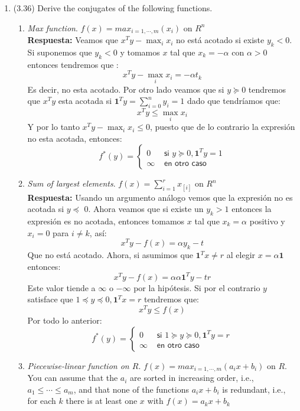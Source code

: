 \documentclass[12pt, oneside]{article}%
\begin{document}
\begin{enumerate}
\begin{enumerate}
\end{enumerate}
\item (3.36) Derive the conjugates of the following functions.
\begin{enumerate}
    \item \textit{Max function}. $f(x) = max_{i=1,\cdots,m}(x_i)$ on $R^n$ \\ 
    \textbf{Respuesta:}
    Veamos que $x^Ty-\max_i x_i$ no está acotado si existe $y_k<0$. Si suponemos que $y_k<0$ y tomamos $x$ tal que $x_k=-\alpha$ con $\alpha>0$ entonces tendremos que :
    $$x^Ty-\max_ix_i=-\alpha t_k$$
    Es decir, no esta acotado.
    Por otro lado veamos que si $y\succeq 0$ tendremos que $x^Ty$ esta acotada si $\textbf{1}^Ty=\sum_{i=0}^n y_i=1$ dado que tendríamos que:
    $$x^Ty\leq \max_i x_i$$
    Y por lo tanto $x^Ty-\max_i x_i\leq0 $, puesto que de lo contrario la expresión no esta acotada, entonces:
    $$f^*(y)=\begin{cases}
    0 & \textsf{ si } y\succeq 0, \textbf{1}^Ty=1\\
    \infty& \textsf{ en otro caso}
    \end{cases}$$
    \item \textit{Sum of largest elements}. $f(x) = \sum_{i=1}^r x_{[i]}$ on $R^n$ \\
    \textbf{Respuesta:}
    Usando un argumento análogo vemos que la expresión no es acotada si $y \preceq$ 0. Ahora veamos que si existe un $y_k>1$ entonces la expresión es no acotada, entonces tomamos $x$ tal que $x_k=\alpha$ positivo y $x_i=0$ para $i\neq k$, así:
    $$x^Ty- f(x)= \alpha y_k-t$$
    Que no está acotado.
    Ahora, si asumimos que $\textbf{1}^Tx\neq r$ al elegir $x= \alpha\textbf{1}$ entonces:
    $$x^Ty- f(x)= \alpha \alpha \textbf{1}^Ty-tr$$
    Este valor tiende a $\infty$ o $-\infty$ por la hipótesis.
    Si por el contrario $y$ satisface que $1\preceq y\preceq 0 , \textbf{1}^Tx = r$ tendremos que:
    $$x^Ty\leq f(x)$$
    Por todo lo anterior:
    $$f^*(y)=\begin{cases}
    0 & \textsf{ si } 1\succeq y\succeq 0, \textbf{1}^Ty=r\\
    \infty& \textsf{ en otro caso}
    \end{cases}$$
    \item \textit{Piecewise-linear function on $R$}. $f(x) = max_{i=1,\cdots,m}(a_ix + b_i)$ on $R$. You can assume that the $a_i$ are sorted in increasing order, i.e., $a_1 \leq \cdots \leq a_m$, and that none of the functions $a_ix + b_i$ is redundant, i.e., for each $k$ there is at least one $x$ with $f(x) = a_kx + b_k$ \\ 

\end{enumerate}
\end{enumerate}
\end{document}
